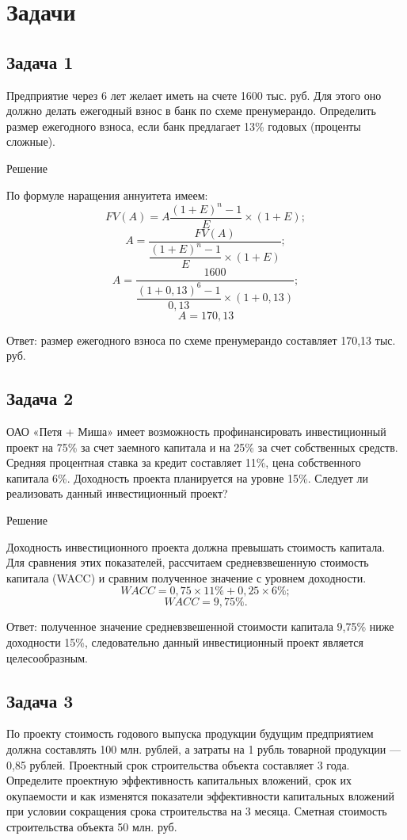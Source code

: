 \section{Задачи}
\subsection*{Задача 1}
Предприятие через 6 лет желает иметь на счете 1600 тыс. руб. Для этого оно должно делать ежегодный взнос в банк по схеме пренумерандо. Определить размер ежегодного взноса, если банк предлагает 13\% годовых (проценты сложные).

\begin{center}
	Решение
\end{center}

По формуле наращения аннуитета имеем:
\[ FV(A) = A\dfrac{(1+E)^n - 1}{E} \times (1 + E) ;\]
\[ A = \dfrac{FV(A)}{\dfrac{(1+E)^n - 1}{E} \times (1 + E)} ;\]
\[ A = \dfrac{1600}{\dfrac{(1+0,13)^6 - 1}{0,13} \times (1 + 0,13)}; \]
\[ A = 170,13  \]

Ответ: размер ежегодного взноса по схеме пренумерандо составляет 170,13 тыс. руб.

\subsection*{Задача 2}
ОАО «Петя + Миша» имеет возможность профинансировать инвестиционный проект на 75\%  за счет заемного капитала и на 25\% за счет собственных средств. Средняя процентная  ставка за кредит составляет 11\%, цена собственного капитала 6\%. Доходность проекта планируется на уровне 15\%. Следует ли реализовать данный инвестиционный проект?

\begin{center}
	Решение
\end{center}

Доходность инвестиционного проекта должна превышать стоимость капитала. Для сравнения этих показателей, рассчитаем средневзвешенную стоимость капитала (WACC) и сравним полученное значение с уровнем доходности.
\[ WACC = 0,75 \times 11\% + 0,25 \times 6\%;\]
\[ WACC = 9,75\%.\]

Ответ: полученное значение средневзвешенной стоимости капитала 9,75\% ниже доходности 15\%, следовательно данный инвестиционный проект является целесообразным.


\subsection*{Задача 3}
По проекту стоимость годового выпуска продукции будущим предприятием должна составлять 100 млн. рублей, а затраты на 1 рубль товарной продукции --- 0,85 рублей. Проектный срок строительства объекта составляет 3 года. Определите проектную эффективность капитальных вложений, срок их окупаемости и как изменятся показатели эффективности капитальных вложений при условии сокращения срока  строительства на 3 месяца. Сметная стоимость строительства объекта 50 млн. руб.

